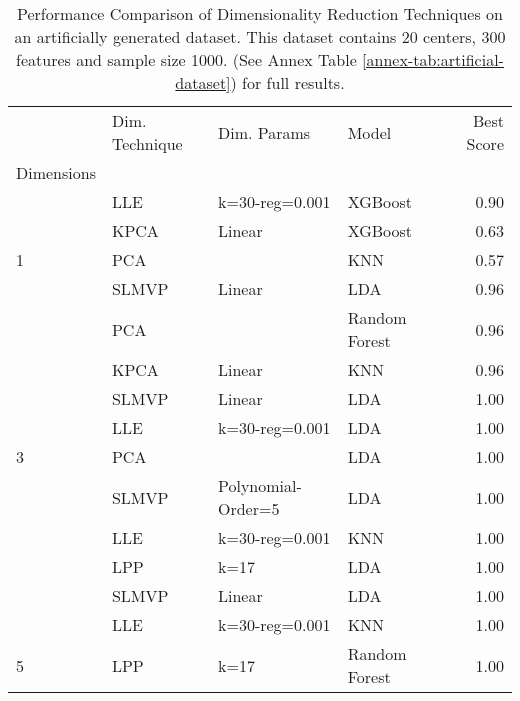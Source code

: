 \begin{table}[!ht]
    \begin{tabular}{llllr}
        \toprule
        {}                                      & Dim. Technique & Dim. Params        & Model         & Best Score \\
        Dimensions                              &                &                    &               &            \\
        \midrule
                                                & LLE            & k=30-reg=0.001     & XGBoost       & 0.90       \\
                                                & KPCA           & Linear             & XGBoost       & 0.63       \\
        \multirow{-3}{*}{1}                     & PCA            &                    & KNN           & 0.57       \\
        \rowcolor{lightgray}                    & SLMVP          & Linear             & LDA           & 0.96       \\
        \rowcolor{lightgray}                    & PCA            &                    & Random Forest & 0.96       \\
        \rowcolor{lightgray}\multirow{-3}{*}{2} & KPCA           & Linear             & KNN           & 0.96       \\
                                                & SLMVP          & Linear             & LDA           & 1.00       \\
                                                & LLE            & k=30-reg=0.001     & LDA           & 1.00       \\
        \multirow{-3}{*}{3}                     & PCA            &                    & LDA           & 1.00       \\
        \rowcolor{lightgray}                    & SLMVP          & Polynomial-Order=5 & LDA           & 1.00       \\
        \rowcolor{lightgray}                    & LLE            & k=30-reg=0.001     & KNN           & 1.00       \\
        \rowcolor{lightgray}\multirow{-3}{*}{4} & LPP            & k=17               & LDA           & 1.00       \\
                                                & SLMVP          & Linear             & LDA           & 1.00       \\
                                                & LLE            & k=30-reg=0.001     & KNN           & 1.00       \\
        \multirow{-3}{*}{5}                     & LPP            & k=17               & Random Forest & 1.00       \\
        \bottomrule
    \end{tabular}
    \caption{Performance Comparison of Dimensionality Reduction Techniques on an artificially generated dataset. This dataset contains 20 centers, 300 features and sample size 1000. (See Annex Table \ref{annex-tab:artificial-dataset}) for full results.}
    \label{tab:artificial-dataset}
\end{table}

